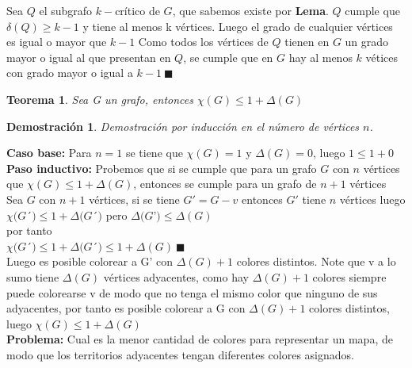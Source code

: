 \documentclass[a4paper,1pt]{report}
\newtheorem*{teo}{Teorema}
\newtheorem*{dem}{Demostración}
\begin{document}
Sea $Q$ el subgrafo $k-$cr\'itico de $G$, que sabemos existe por \textbf{Lema}. $Q$ cumple que $\delta(Q)\geq k-1$ y tiene al menos k vértices. Luego el grado de cualquier vértices es igual o mayor que $k-1$
Como todos los v\'ertices de $Q$ tienen en $G$ un grado mayor o igual al que presentan en $Q$, se cumple que en $G$ hay al menos $k$ v\'etices con grado mayor o igual a $k-1 \ \blacksquare$

\begin{teo}
 Sea G un grafo, entonces $\chi(G)\leq 1 + \Delta(G)$
\end{teo}

\begin{dem}
Demostración por inducción en el número de vértices $n$. 
\end{dem}

\textbf{Caso base:} Para $n=1$ se tiene que $\chi(G)=1$ y $\Delta(G)=0$, luego $1\leq1+0$\\

\textbf{Paso inductivo:} Probemos que si se cumple que para un grafo $G$ con  $n$ v\'ertices que $\chi(G) \leq 1 + \Delta(G)$, entonces se cumple para un grafo de $n+1$ v\'ertices\\

Sea $G$ con $n+1$ vértices, si se tiene $G'=G-v$ entonces $G'$ tiene $n$ vértices luego
$\chi(G$´$)\leq 1 + \Delta(G$´$)$ pero $\Delta(G$'$)\leq \Delta(G)$\\ 
por tanto\\
$\chi(G$´$)\leq 1 + \Delta(G$´$)\leq 1 + \Delta(G) \  \blacksquare$\\

Luego es posible colorear a G' con $\Delta(G)+1$ colores distintos. Note que v a lo sumo tiene $\Delta(G)$ vértices adyacentes, como hay $\Delta(G)+1$ colores siempre puede colorearse v de modo que no tenga el mismo color que ninguno de sus adyacentes, por tanto es posible colorear a G con $\Delta(G)+1$ colores distintos, luego $\chi(G)\leq 1 + \Delta(G)$\\


\textbf{Problema:} Cual es la menor cantidad de colores para representar un mapa, de modo que los territorios adyacentes tengan diferentes colores asignados.
\end{document}
